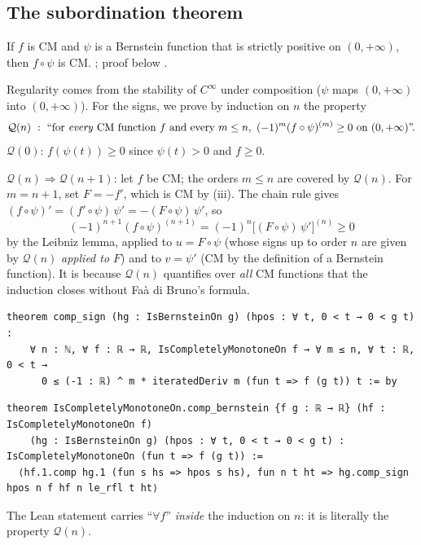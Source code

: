 \subsection{The subordination theorem}
\begin{theorem}[subordination]\label{ch2:thm:subord}
If $f$ is CM and $\psi$ is a Bernstein function that is strictly positive on $(0,+\infty)$, then $f\circ\psi$ is
CM. \tierA{}; proof below \tierC.
\end{theorem}
\begin{humanproof}
Regularity comes from the stability of $C^\infty$ under composition ($\psi$ maps $(0,+\infty)$ into $(0,+\infty)$).
For the signs, we prove by induction on $n$ the property
\[\mathcal Q(n)\ :\ \text{``for \emph{every} CM function } f\text{ and every } m\le n,\ (-1)^m(f\circ\psi)^{(m)}\ge0\text{ on }(0,+\infty)\text{''.}\]
$\mathcal Q(0)$: $f(\psi(t))\ge0$ since $\psi(t)>0$ and $f\ge0$.

$\mathcal Q(n)\Rightarrow\mathcal Q(n+1)$: let $f$ be CM; the orders $m\le n$ are covered by $\mathcal Q(n)$. For
$m=n+1$, set $F=-f'$, which is CM by (iii). The chain rule gives
$(f\circ\psi)'=(f'\circ\psi)\,\psi'=-(F\circ\psi)\,\psi'$, so
\[(-1)^{n+1}(f\circ\psi)^{(n+1)}=(-1)^n\bigl[(F\circ\psi)\,\psi'\bigr]^{(n)}\ge0\]
by the Leibniz lemma, applied to $u=F\circ\psi$ (whose signs up to order $n$ are given by $\mathcal Q(n)$
\emph{applied to $F$}) and to $v=\psi'$ (CM by the definition of a Bernstein function). It is because $\mathcal Q(n)$
quantifies over \emph{all} CM functions that the induction closes without Faà di Bruno's formula.
\end{humanproof}
\begin{leanbox}
\begin{lstlisting}[style=chdeux]
theorem comp_sign (hg : IsBernsteinOn g) (hpos : ∀ t, 0 < t → 0 < g t) :
    ∀ n : ℕ, ∀ f : ℝ → ℝ, IsCompletelyMonotoneOn f → ∀ m ≤ n, ∀ t : ℝ, 0 < t →
      0 ≤ (-1 : ℝ) ^ m * iteratedDeriv m (fun t => f (g t)) t := by
\end{lstlisting}
\begin{lstlisting}[style=chdeux]
theorem IsCompletelyMonotoneOn.comp_bernstein {f g : ℝ → ℝ} (hf : IsCompletelyMonotoneOn f)
    (hg : IsBernsteinOn g) (hpos : ∀ t, 0 < t → 0 < g t) : IsCompletelyMonotoneOn (fun t => f (g t)) :=
  ⟨hf.1.comp hg.1 (fun s hs => hpos s hs), fun n t ht => hg.comp_sign hpos n f hf n le_rfl t ht⟩
\end{lstlisting}
\end{leanbox}
\noindent The Lean statement  carries ``$\forall f$'' \emph{inside} the induction on $n$: it is
literally the property $\mathcal Q(n)$.

